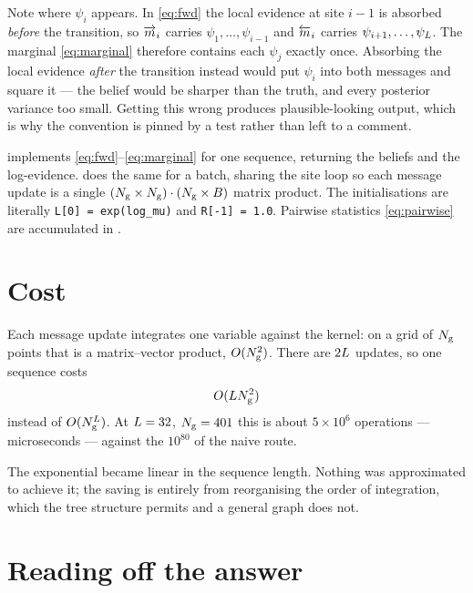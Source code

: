 \begin{pitfall}
Note where $\psi_i$ appears. In \eqref{eq:fwd} the local evidence at site $i-1$ is absorbed
\emph{before} the transition, so $\overrightarrow{m}_i$ carries $\psi_1,\dots,\psi_{i-1}$ and $\overleftarrow{m}_i$
carries $\psi_{i+1},\dots,\psi_{L}$. The marginal \eqref{eq:marginal} therefore contains
each $\psi_j$ exactly once. Absorbing the local evidence \emph{after} the transition instead
would put $\psi_i$ into both messages and square it --- the belief would be sharper than the
truth, and every posterior variance too small. Getting this wrong produces plausible-looking
output, which is why the convention is pinned by a test rather than left to a comment.
\end{pitfall}

\begin{codebox}
 implements \eqref{eq:fwd}--\eqref{eq:marginal} for one
sequence, returning the beliefs and the log-evidence.
 does the same for a batch, sharing the site loop so
each message update is a single $(N_{\mathrm{g}}\times N_{\mathrm{g}})\cdot(N_{\mathrm{g}}\times B)$ matrix product.
The initialisations are literally \texttt{L[0] = exp(log\_mu)} and \texttt{R[-1] = 1.0}.
Pairwise statistics \eqref{eq:pairwise} are accumulated in .
\end{codebox}

\section{Cost}

Each message update integrates one variable against the kernel: on a grid of $N_{\mathrm{g}}$ points
that is a matrix--vector product, $O(N_{\mathrm{g}}^2)$. There are $2L$ updates, so one sequence
costs
\begin{equation}
O(L N_{\mathrm{g}}^2)
\end{equation}
instead of $O(N_{\mathrm{g}}^{L})$. At $L=32$, $N_{\mathrm{g}}=401$ this is about $5\times10^6$
operations --- microseconds --- against the $10^{80}$ of the naive route.

\begin{intuition}
The exponential became linear in the sequence length. Nothing was approximated to achieve it;
the saving is entirely from reorganising the order of integration, which the tree structure
permits and a general graph does not.
\end{intuition}

\section{Reading off the answer}

